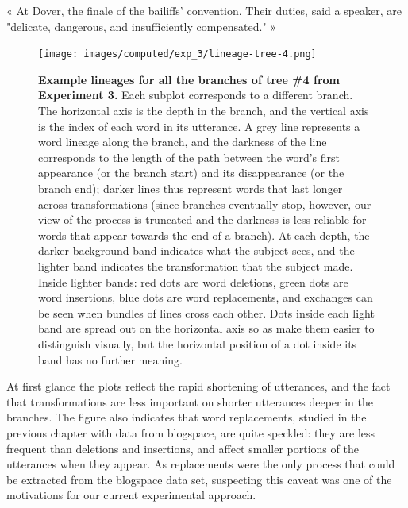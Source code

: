 \begin{nquote} %
  « At Dover, the finale of the bailiffs' convention. Their duties, said a speaker, are "delicate, dangerous, and insufficiently compensated." »
\end{nquote}

\begin{figure}[h]
  \centering
  \texttt{[image: images/computed/exp\_3/lineage-tree-4.png]}
  \caption[Example lineages for all the branches of tree \#4 from Experiment 3]{
  \textbf{Example lineages for all the branches of tree \#4 from Experiment 3.}
  Each subplot corresponds to a different branch.
  The horizontal axis is the depth in the branch, and the vertical axis is the index of each word in its utterance.
  A grey line represents a word lineage along the branch, and the darkness of the line corresponds to the length of the path between the word's first appearance (or the branch start) and its disappearance (or the branch end);
  darker lines thus represent words that last longer across transformations (since branches eventually stop, however, our view of the process is truncated and the darkness is less reliable for words that appear towards the end of a branch).
  At each depth, the darker background band indicates what the subject sees, and the lighter band indicates the transformation that the subject made.
  Inside lighter bands:
  red dots are word deletions, green dots are word insertions, blue dots are word replacements, and exchanges can be seen when bundles of lines cross each other.
  Dots inside each light band are spread out on the horizontal axis so as make them easier to distinguish visually, but the horizontal position of a dot inside its band has no further meaning.
  }
  \label{fig:gistr-lineage-tree}
\end{figure}

At first glance the plots reflect the rapid shortening of utterances,
and the fact that transformations are less important on shorter
utterances deeper in the branches. The figure also indicates that word
replacements, studied in the previous chapter with data from blogspace,
are quite speckled: they are less frequent than deletions and
insertions, and affect smaller portions of the utterances when they
appear. As replacements were the only process that could be extracted
from the blogspace data set, suspecting this caveat was one of the
motivations for our current experimental approach.

